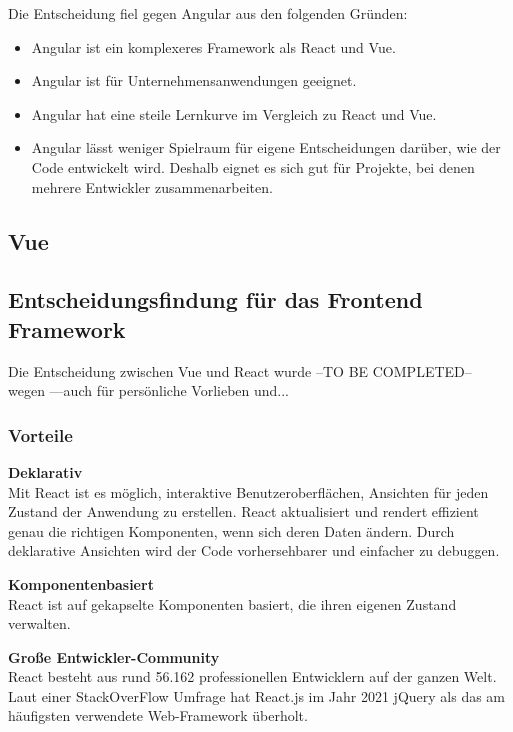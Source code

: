Die Entscheidung fiel gegen Angular aus den folgenden Gründen:
\begin{itemize}
\item
    Angular ist ein komplexeres Framework als React und Vue.
\item
    Angular ist für Unternehmensanwendungen geeignet. 
\item
    Angular hat eine steile Lernkurve im Vergleich zu React und Vue.{\cite{E01}}
\item
    Angular lässt weniger Spielraum für eigene Entscheidungen darüber, wie der Code entwickelt wird. Deshalb eignet es sich gut für Projekte, bei denen mehrere Entwickler zusammenarbeiten. 
\end{itemize}
\subsection{Vue}


\subsection{Entscheidungsfindung für das Frontend Framework}
Die Entscheidung zwischen Vue und React wurde --TO BE COMPLETED-- wegen ---auch für persönliche Vorlieben und...
\newline
\subsubsection{Vorteile}
\textbf{Deklarativ} \\
Mit React ist es möglich, interaktive Benutzeroberflächen, Ansichten für jeden Zustand der Anwendung zu erstellen. React aktualisiert und rendert effizient genau die richtigen Komponenten, wenn sich deren Daten ändern.
Durch deklarative Ansichten wird der Code vorhersehbarer und einfacher zu debuggen.
\newline

\textbf{Komponentenbasiert}\\
React ist auf gekapselte Komponenten basiert, die ihren eigenen Zustand verwalten.
\newline

\textbf{Große Entwickler-Community}\\
React besteht aus rund 56.162 professionellen Entwicklern auf der ganzen Welt.
Laut einer StackOverFlow Umfrage hat React.js im Jahr 2021 jQuery als das am häufigsten verwendete Web-Framework überholt. {\cite{SO01}}
\newpage

